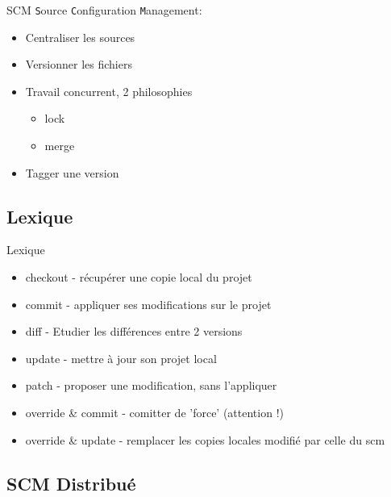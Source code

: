 \documentclass[handout]{beamer}
\begin{document}
\begin{frame}
	\begin{block}{SCM}
		\texttt{S}ource \texttt{C}onfiguration \texttt{M}anagement:
		\begin{itemize}
			\item Centraliser les sources
			\item Versionner les fichiers
			\item Travail concurrent, 2 philosophies
				\begin{itemize}
					\item lock 
					\item merge 
				\end{itemize}
			\item Tagger une version 
		\end{itemize}
	\end{block}
\end{frame}

\subsection{Lexique}

\begin{frame}
	\begin{block}{Lexique}
		\begin{itemize}
			\item checkout - récupérer une copie local du projet
			\item commit - appliquer ses modifications sur le projet
			\item diff - Etudier les différences entre 2 versions
			\item update - mettre à jour son projet local
			\item patch - proposer une modification, sans l'appliquer
			\item override \& commit - comitter de 'force' (attention !)
			\item override \& update - remplacer les copies locales modifié par celle du scm 
		\end{itemize}
	\end{block}
\end{frame}

\subsection{SCM Distribué}
\end{document}

